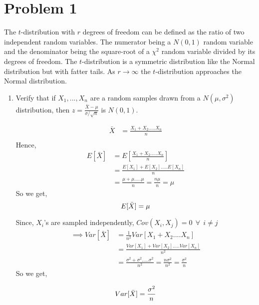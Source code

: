\section*{Problem 1}
\noindent The $t$-distribution with $r$ degrees of freedom can be defined as the ratio of two independent random variables. The numerator being a $N(0, 1)$ random variable and the denominator being the square-root of a $\chi^2$ random variable divided by its degrees of freedom. The $t$-distribution is a symmetric distribution like the Normal distribution but with fatter tails. As $r \to \infty$ the $t$-distribution approaches the Normal distribution.





\begin{enumerate}
\item 
\noindent Verify that if $X_1,...,X_n$ are a random samples drawn from a $N(\mu, \sigma^2)$ distribution, then $z =  \frac{\bar{X} - \mu}{\sigma /\sqrt{n}}$ is $N(0,1)$.

\begin{align*}
\bar{X} &= \frac{X_1 + X_2 .....X_n}{n}\\
\end{align*}
\noindent Hence,
\begin{align*}
E[\bar{X}] &= E[\frac{X_1 + X_2 .....X_n}{n}]\\
&= \frac{E[X_1] + E[X_2] .....E[X_n]}{n}\\
&= \frac{\mu + \mu .....\mu}{n} = \frac{n \mu}{n} = \mu
\end{align*}
\noindent So we get,
\begin{equation}
E[\bar{X}] = \mu\\
\end{equation}

Since, $X_i$'s are sampled independently, $Cov(X_i , X_j) = 0 \ \ \forall \ \ i \neq j$ 
\begin{align*}
\implies Var[\bar{X}] &= \frac{1}{n^2}Var[X_1 + X_2....X_n]\\
&= \frac{Var[X_1] + Var[X_2] .....Var[X_n]}{n^2}\\
&= \frac{\sigma^2 + \sigma^2.....\sigma^2}{n^2} =  \frac{n \sigma^2}{n^2} = 
\frac{\sigma^2}{n} 
\end{align*}
\noindent So we get,

\begin{equation}
Var[\bar{X}] = \frac{\sigma^2}{n}\\
\end{equation}


\end{enumerate}
